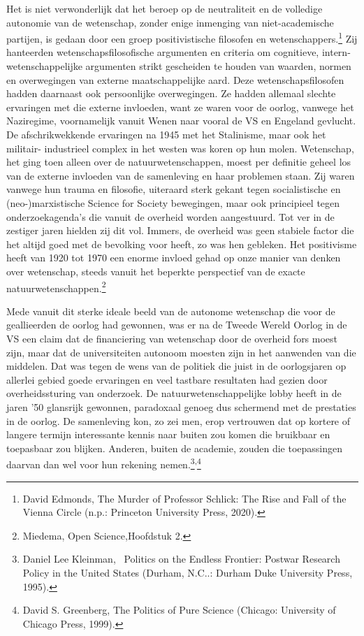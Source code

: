 \documentclass[empirical, authordate, ]{new-jote-article}
\begin{document}
	Het is niet verwonderlijk dat het beroep op de neutraliteit en de volledige autonomie van de wetenschap, zonder enige inmenging van niet-academische partijen, is gedaan door een groep positivistische filosofen en wetenschappers.\footnote{David Edmonds, The Murder of Professor Schlick: The Rise and Fall of the Vienna Circle (n.p.: Princeton University Press, 2020).} Zij hanteerden wetenschapsfilosofische argumenten en criteria om cognitieve, intern-wetenschappelijke argumenten strikt gescheiden te houden van waarden, normen en overwegingen van externe maatschappelijke aard. Deze wetenschapsfilosofen hadden daarnaast ook persoonlijke overwegingen. Ze hadden allemaal slechte ervaringen met die externe invloeden, want ze waren voor de oorlog, vanwege het Naziregime, voornamelijk vanuit Wenen naar vooral de VS en Engeland gevlucht. De afschrikwekkende ervaringen na 1945 met het Stalinisme, maar ook het militair- industrieel complex in het westen was koren op hun molen. Wetenschap, het ging toen alleen over de natuurwetenschappen, moest per definitie geheel los van de externe invloeden van de samenleving en haar problemen staan. Zij waren vanwege hun trauma en filosofie, uiteraard sterk gekant tegen socialistische en (neo-)marxistische Science for Society bewegingen, maar ook principieel tegen onderzoekagenda's die vanuit de overheid worden aangestuurd. Tot ver in de zestiger jaren hielden zij dit vol. Immers, de overheid was geen stabiele factor die het altijd goed met de bevolking voor heeft, zo was hen gebleken. Het positivisme heeft van 1920 tot 1970 een enorme invloed gehad op onze manier van denken over wetenschap, steeds vanuit het beperkte perspectief van de exacte natuurwetenschappen.\footnote{Miedema, Open Science,Hoofdstuk 2. }



	Mede vanuit dit sterke ideale beeld van de autonome wetenschap die voor de geallieerden de oorlog had gewonnen, was er na de Tweede Wereld Oorlog in de VS een claim dat de financiering van wetenschap door de overheid fors moest zijn, maar dat de universiteiten autonoom moesten zijn in het aanwenden van die middelen. Dat was tegen de wens van de politiek die juist in de oorlogsjaren op allerlei gebied goede ervaringen en veel tastbare resultaten had gezien door overheidssturing van onderzoek. De natuurwetenschappelijke lobby heeft in de jaren '50 glansrijk gewonnen, paradoxaal genoeg dus schermend met de prestaties in de oorlog. De samenleving kon, zo zei men, erop vertrouwen dat op kortere of langere termijn interessante kennis naar buiten zou komen die bruikbaar en toepasbaar zou blijken. Anderen, buiten de academie, zouden die toepassingen daarvan dan wel voor hun rekening nemen.\footnote{Daniel Lee Kleinman,  Politics on the Endless Frontier: Postwar Research Policy in the United States (Durham, N.C..: Durham Duke University Press, 1995).}\textsuperscript{,}\footnote{David S. Greenberg, The Politics of Pure Science (Chicago: University of Chicago Press, 1999).}
\end{document}
